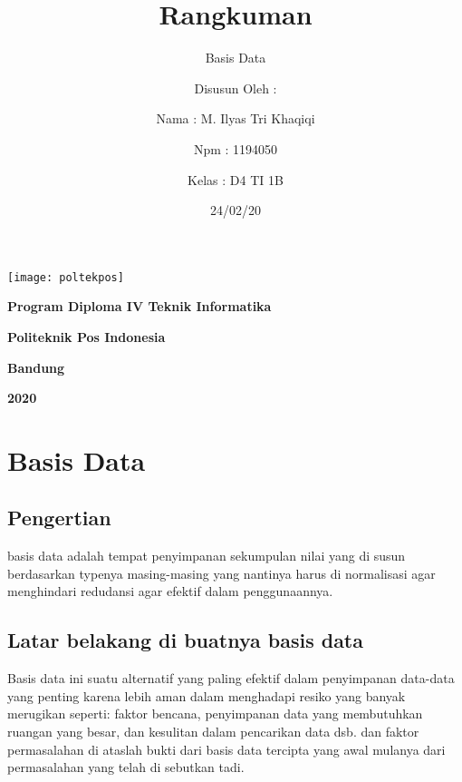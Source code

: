 \documentclass[a4paper,12 pt]{article}
\title{{Rangkuman}}
\author{Basis Data}
\date{24/02/20}
\begin{document}
\maketitle

\begin{center}
\texttt{[image: poltekpos]}
\end{center}

\begin{center}
\author{Disusun Oleh :}
\end{center}
\begin{center}
\author{Nama : M. Ilyas Tri Khaqiqi}
\end{center}
\begin{center}
\author{Npm : 1194050}
\end{center}
\begin{center}
\author{Kelas : D4 TI 1B}
\end{center}
\vspace{1cm}
\begin{center}
\textbf{Program Diploma IV Teknik Informatika}
\end{center}
\begin{center}
\textbf{Politeknik Pos Indonesia}
\end{center}
\begin{center}
\textbf{Bandung}
\end{center}
\begin{center}
\textbf{2020}
\end{center}




\newpage
\section{Basis Data}
\subsection{Pengertian}
	basis data adalah tempat penyimpanan sekumpulan nilai yang di susun berdasarkan typenya masing-masing yang nantinya harus di normalisasi agar menghindari redudansi agar efektif dalam penggunaannya. 
\subsection{Latar belakang di buatnya basis data}
	Basis data ini suatu alternatif yang paling efektif dalam penyimpanan data-data yang penting karena lebih aman dalam menghadapi resiko yang banyak merugikan seperti: faktor bencana, penyimpanan data yang membutuhkan ruangan yang besar, dan kesulitan dalam pencarikan data dsb. dan faktor permasalahan di ataslah bukti dari basis data tercipta yang awal mulanya dari permasalahan yang telah di sebutkan tadi.
\end{document}
